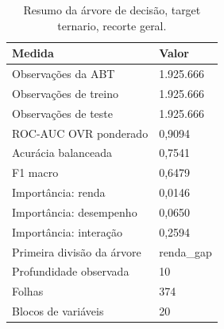 \begin{table}
\caption{Resumo da árvore de decisão, target ternario, recorte geral.}
\label{tab:tabela_treeClassification_ternario_recorte_geral_principal_in_sample_e5}
\begin{tabular}{ll}
\toprule
Medida & Valor \\
\midrule
Observações da ABT & 1.925.666 \\
Observações de treino & 1.925.666 \\
Observações de teste & 1.925.666 \\
ROC-AUC OVR ponderado & 0,9094 \\
Acurácia balanceada & 0,7541 \\
F1 macro & 0,6479 \\
Importância: renda & 0,0146 \\
Importância: desempenho & 0,0650 \\
Importância: interação & 0,2594 \\
Primeira divisão da árvore & renda\_gap \\
Profundidade observada & 10 \\
Folhas & 374 \\
Blocos de variáveis & 20 \\
\bottomrule
\end{tabular}
\end{table}
